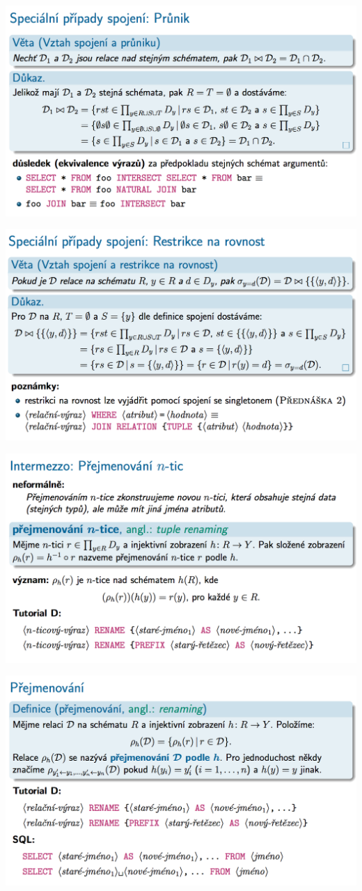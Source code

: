 \documentclass[10pt,a4paper]{article}
\begin{document}
	\includegraphics[scale=0.4]{img/39}
	
	\includegraphics[scale=0.4]{img/40}
	
	\includegraphics[scale=0.4]{img/41}
	
	\includegraphics[scale=0.4]{img/42}
	
\end{document}
